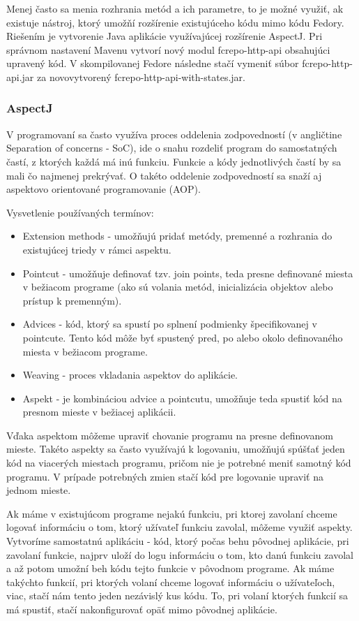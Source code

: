 \documentclass[thesis=M,slovak]{FITthesis}[2013/05/06]
\begin{document}
Menej často sa menia rozhrania metód a ich parametre, to je možné využiť, ak existuje nástroj, ktorý umožňí rozšírenie existujúceho kódu mimo kódu Fedory. Riešením je vytvorenie Java aplikácie využívajúcej rozšírenie AspectJ. Pri správnom nastavení Mavenu vytvorí nový modul fcrepo-http-api obsahujúci upravený kód. V skompilovanej Fedore následne stačí vymeniť súbor fcrepo-http-api.jar za novovytvorený fcrepo-http-api-with-states.jar.

\subsubsection{AspectJ}
V programovaní sa často využíva proces oddelenia zodpovedností (v angličtine Separation of concerns - SoC), ide o snahu rozdeliť program do samostatných častí, z ktorých každá má inú funkciu. Funkcie a kódy jednotlivých častí by sa mali čo najmenej prekrývať. O takéto oddelenie zodpovedností sa snaží aj aspektovo orientované programovanie (AOP).

Vysvetlenie používaných termínov:
\begin{itemize}
	\item Extension methods - umožňujú pridať metódy, premenné a rozhrania do existujúcej triedy v rámci aspektu.
	\item Pointcut - umožňuje definovať tzv. join points, teda presne definované miesta v bežiacom programe (ako sú volania metód, inicializácia objektov alebo prístup k premenným).
	\item Advices - kód, ktorý sa spustí po splnení podmienky špecifikovanej v pointcute. Tento kód môže byť spustený pred, po alebo okolo definovaného miesta v bežiacom programe.
	\item Weaving - proces vkladania aspektov do aplikácie.
	\item Aspekt - je kombináciou advice a pointcutu, umožňuje teda spustiť kód na presnom mieste v bežiacej aplikácii.
\end{itemize}
Vďaka aspektom môžeme upraviť chovanie programu na presne definovanom mieste. Takéto aspekty sa často využívajú k logovaniu, umožňujú spúšťať jeden kód na viacerých miestach programu, pričom nie je potrebné meniť samotný kód programu. V prípade potrebných zmien stačí kód pre logovanie upraviť na jednom mieste. \cite{aspect} 

Ak máme v existujúcom programe nejakú funkciu, pri ktorej zavolaní chceme logovať informáciu o tom, ktorý užívateľ funkciu zavolal, môžeme využiť aspekty. Vytvoríme samostatnú aplikáciu - kód, ktorý počas behu pôvodnej aplikácie, pri zavolaní funkcie, najprv uloží do logu informáciu o tom, kto danú funkciu zavolal a až potom umožní beh kódu tejto funkcie v pôvodnom programe. Ak máme takýchto funkcií, pri ktorých volaní chceme logovať informáciu o užívateľoch, viac, stačí nám tento jeden nezávislý kus kódu. To, pri volaní ktorých funkcií sa má spustiť, stačí nakonfigurovať opäť mimo pôvodnej aplikácie.
\end{document}
